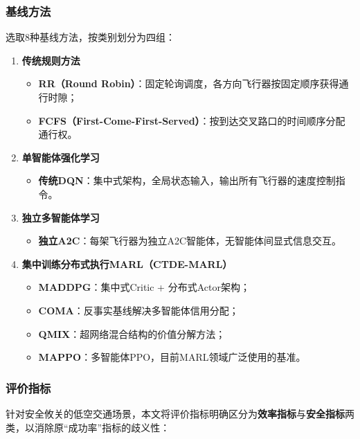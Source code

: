 \documentclass[12pt,a4paper,UTF8]{ctexart}
\begin{document}
\subsubsection{基线方法}

选取8种基线方法，按类别划分为四组：

\begin{enumerate}[label=\textbf{第\arabic*组：}]
    \item \textbf{传统规则方法}
    \begin{itemize}
        \item \textbf{RR（Round Robin）}：固定轮询调度，各方向飞行器按固定顺序获得通行时隙；
        \item \textbf{FCFS（First-Come-First-Served）}：按到达交叉路口的时间顺序分配通行权。
    \end{itemize}
    \item \textbf{单智能体强化学习}
    \begin{itemize}
        \item \textbf{传统DQN}：集中式架构，全局状态输入，输出所有飞行器的速度控制指令。
    \end{itemize}
    \item \textbf{独立多智能体学习}
    \begin{itemize}
        \item \textbf{独立A2C}：每架飞行器为独立A2C智能体，无智能体间显式信息交互。
    \end{itemize}
    \item \textbf{集中训练分布式执行MARL（CTDE-MARL）}
    \begin{itemize}
        \item \textbf{MADDPG}：集中式Critic + 分布式Actor架构；
        \item \textbf{COMA}：反事实基线解决多智能体信用分配；
        \item \textbf{QMIX}：超网络混合结构的价值分解方法；
        \item \textbf{MAPPO}：多智能体PPO，目前MARL领域广泛使用的基准。
    \end{itemize}
\end{enumerate}

\subsubsection{评价指标}

针对安全攸关的低空交通场景，本文将评价指标明确区分为\textbf{效率指标}与\textbf{安全指标}两类，以消除原``成功率''指标的歧义性：
\end{document}
